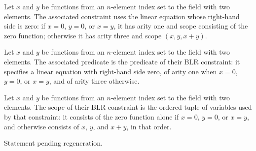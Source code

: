\begin{definition}
\label{FABL.blrCSPConstraint}
\leanok
{}
Let $x$ and $y$ be functions from an $n$-element index set to the field with two
elements. The associated constraint uses the linear equation whose right-hand side is
zero: if $x=0$, $y=0$, or $x=y$, it has arity one and scope consisting of the zero
function; otherwise it has arity three and scope $(x,y,x+y)$.
\end{definition}

\begin{definition}
\label{FABL.blrCSPPredicate}
\leanok
{}
Let $x$ and $y$ be functions from an $n$-element index set to the field with two
elements. The associated predicate is the predicate of their BLR constraint: it
specifies a linear equation with right-hand side zero, of arity one when $x=0$, $y=0$,
or $x=y$, and of arity three otherwise.
\end{definition}

\begin{definition}
\label{FABL.blrCSPScope}
\leanok
{}
Let $x$ and $y$ be functions from an $n$-element index set to the field with two
elements. The scope of their BLR constraint is the ordered tuple of variables used by
that constraint: it consists of the zero function alone if $x=0$, $y=0$, or $x=y$, and
otherwise consists of $x$, $y$, and $x+y$, in that order.
\end{definition}

\begin{theorem}
\label{FABL.blrCSPConstraint_eq_zero_of_collision}
\leanok
{}
Statement pending regeneration.
\end{theorem}

